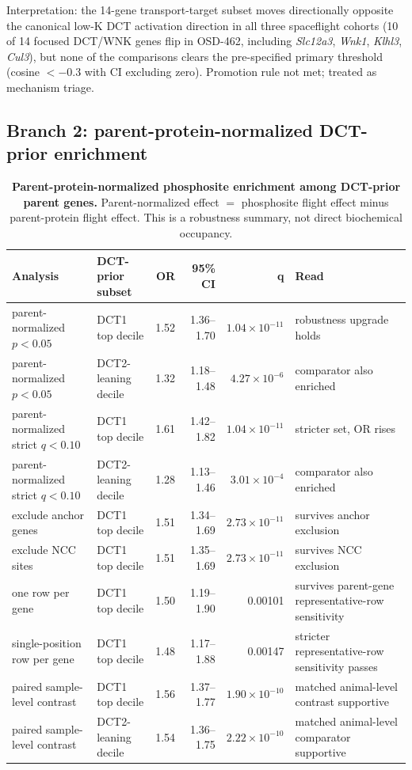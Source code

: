 \documentclass[10pt]{article}
\newcommand{\gene}[1]{\textit{#1}}
\begin{document}
\noindent
Interpretation: the 14-gene transport-target subset moves directionally opposite the canonical low-K DCT activation direction in all three spaceflight cohorts (10 of 14 focused DCT/WNK genes flip in OSD-462, including \gene{Slc12a3}, \gene{Wnk1}, \gene{Klhl3}, \gene{Cul3}), but none of the comparisons clears the pre-specified primary threshold (cosine $<-0.3$ with CI excluding zero). Promotion rule not met; treated as mechanism triage.

\subsection{Branch 2: parent-protein-normalized DCT-prior enrichment}

\begin{table}[H]
\centering\small
\caption{\textbf{Parent-protein-normalized phosphosite enrichment among DCT-prior parent genes.} Parent-normalized effect $=$ phosphosite flight effect minus parent-protein flight effect. This is a robustness summary, not direct biochemical occupancy.}
\label{tab:occupancy}
\begin{tabularx}{\textwidth}{p{}p{}rrrX}
\toprule
Analysis & DCT-prior subset & OR & 95\% CI & q & Read \\
\midrule
parent-normalized $p<0.05$ & DCT1 top decile & 1.52 & 1.36--1.70 & $1.04\times10^{-11}$ & robustness upgrade holds \\
parent-normalized $p<0.05$ & DCT2-leaning decile & 1.32 & 1.18--1.48 & $4.27\times10^{-6}$ & comparator also enriched \\
parent-normalized strict $q<0.10$ & DCT1 top decile & 1.61 & 1.42--1.82 & $1.04\times10^{-11}$ & stricter set, OR rises \\
parent-normalized strict $q<0.10$ & DCT2-leaning decile & 1.28 & 1.13--1.46 & $3.01\times10^{-4}$ & comparator also enriched \\
exclude anchor genes & DCT1 top decile & 1.51 & 1.34--1.69 & $2.73\times10^{-11}$ & survives anchor exclusion \\
exclude NCC sites & DCT1 top decile & 1.51 & 1.35--1.69 & $2.73\times10^{-11}$ & survives NCC exclusion \\
one row per gene & DCT1 top decile & 1.50 & 1.19--1.90 & 0.00101 & survives parent-gene representative-row sensitivity \\
single-position row per gene & DCT1 top decile & 1.48 & 1.17--1.88 & 0.00147 & stricter representative-row sensitivity passes \\
paired sample-level contrast & DCT1 top decile & 1.56 & 1.37--1.77 & $1.90\times10^{-10}$ & matched animal-level contrast supportive \\
paired sample-level contrast & DCT2-leaning decile & 1.54 & 1.36--1.75 & $2.22\times10^{-10}$ & matched animal-level comparator supportive \\
\bottomrule
\end{tabularx}
\end{table}
\end{document}
